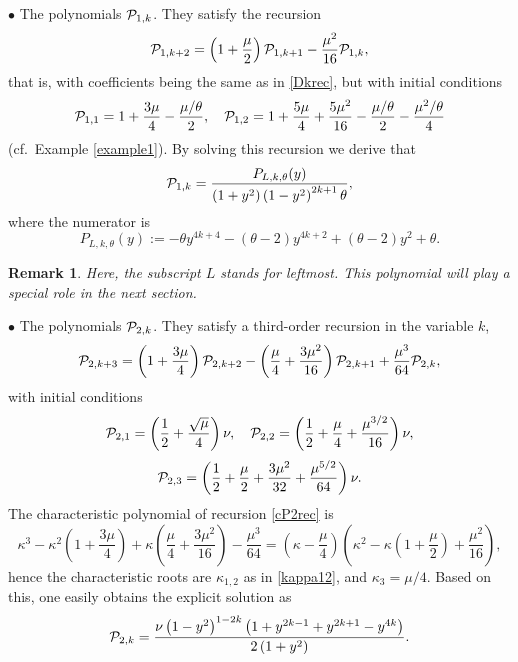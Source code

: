 \documentclass[a4paper]{article}
\newtheorem{remark}{Remark}
\newcommand{\te}{\theta}
\newcommand{\Pol}{P_{L,k,\te}(y)}
\newcommand{\cP}{{\cal{P}}}
\begin{document}
$\bullet$  The polynomials $\cP_{1,k}$. They satisfy the recursion 
\[
\cP_{1,k+2}=\left(1+\frac{\mu}{2}\right)\cP_{1,k+1}-\frac{\mu^2}{16}\cP_{1,k},
\]
that is, with coefficients being the same as in \eqref{Dkrec}, but with initial conditions
\[
\cP_{1,1}=1+\frac{3 \mu }{4}-\frac{\mu /\theta}{2  }, \quad \cP_{1,2}=1+\frac{5 \mu }{4}+\frac{5 \mu ^2}{16}-\frac{\mu/\theta }{2  }-\frac{\mu ^2/\theta}{4  }
\]
(cf.~Example \ref{example1}). By solving this recursion we derive that
\begin{equation}\label{P1kexpl}
\cP_{1,k}=\frac{\Pol}{  \left(1+y^2\right)\left(1-y^2\right)^{2 k+1}\theta},
\end{equation}
where the numerator is 
\begin{equation}\label{poldef}
\Pol:=-\theta  y^{4 k+4}-(\theta -2) y^{4 k+2}+(\theta -2) y^2+\theta.
\end{equation}
\begin{remark}
Here, the subscript $L$ stands for \emph{leftmost}. This polynomial will play a special role in the next section.
\end{remark}


$\bullet$  The polynomials $\cP_{2,k}$. They satisfy a third-order recursion in the variable $k$,
\begin{equation}\label{cP2rec}
\cP_{2,k+3}=\left(1+\frac{3\mu}{4}\right)\cP_{2,k+2}-\left(\frac{\mu }{4}+\frac{3 \mu ^2}{16}\right)\cP_{2,k+1}+\frac{\mu ^3}{64}\cP_{2,k},
\end{equation}
with initial conditions 
\[
\cP_{2,1}=\left(\frac{1}{2}+\frac{\sqrt{\mu }}{4}\right) \nu, \quad \cP_{2,2}=\left(\frac{1}{2}+\frac{\mu }{4}+\frac{\mu ^{3/2}}{16}\right) \nu,
\]
\[
\cP_{2,3}=\left(\frac{1}{2}+\frac{\mu }{2}+\frac{3 \mu ^2}{32}+\frac{\mu ^{5/2}}{64}\right) \nu.
\]
The  characteristic polynomial of recursion \eqref{cP2rec} is 
\[
\kappa ^3-\kappa ^2 \left(1+\frac{3 \mu }{4}\right)+\kappa  \left(\frac{\mu }{4}+\frac{3 \mu ^2}{16}\right)-\frac{\mu ^3}{64}=\left(\kappa-\frac{\mu }{4}\right)\left(\kappa ^2-\kappa  \left(1+\frac{\mu }{2}\right)+\frac{\mu ^2}{16}\right),
\]
hence the characteristic roots are $\kappa_{1,2}$ as in \eqref{kappa12}, and $\kappa_3={\mu }/{4}$. Based on this, one easily obtains the explicit solution as
\begin{equation}\label{cP2kexpl}
\cP_{2,k}=\frac{\nu  \left(1-y^2\right)^{1-2 k} \left(1+y^{2 k-1}+y^{2 k+1}-y^{4 k}\right)}{2 \left(1+y^2\right)}.
\end{equation}
\end{document}
